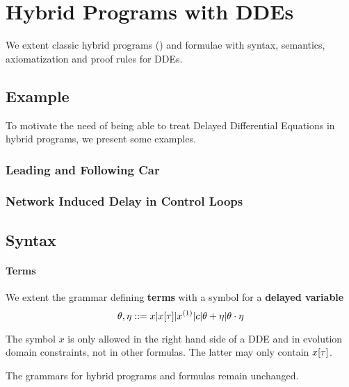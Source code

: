\chapter{Hybrid Programs with DDEs}\label{hybrid-programs-with-ddes}

    We extent classic hybrid programs (\HP) and \dL formulae with syntax, semantics, axiomatization and proof rules for DDEs.

    \section{Example}
        \label{example-hp-cars}
        To motivate the need of being able to treat Delayed Differential Equations in hybrid programs, we present some examples.

        \subsection{Leading and Following Car}

        \subsection{Network Induced Delay in Control Loops}

    \section{Syntax}
        \label{sec:syntax}

        \subsubsection{Terms}
            \label{sec:terms}

            We extent the grammar defining \textbf{terms} with a symbol for a \textbf{delayed variable}
            \begin{equation}
                \theta,\eta ::= x|\xtau|\D{x}|c|\theta+\eta|\theta\cdot\eta
            \end{equation}

            The symbol $x$ is only allowed in the right hand side of a DDE and in evolution domain constraints, not in other formulas. The latter may only contain $x[\tau]$.

    The grammars for hybrid programs and \dL formulas remain unchanged.



